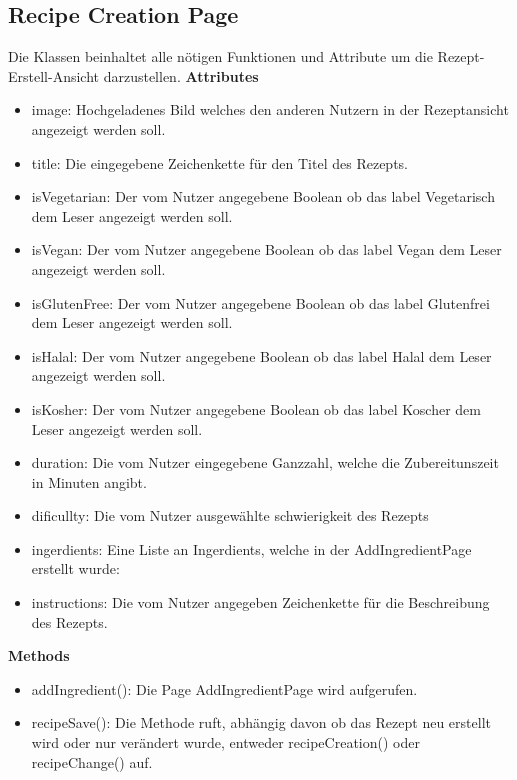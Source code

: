 \documentclass[parskip=full]{scrartcl}
\begin{document}
    \subsection{Recipe Creation Page}
        Die Klassen beinhaltet alle nötigen Funktionen und Attribute um die Rezept-Erstell-Ansicht darzustellen.\newline
        \textbf{Attributes}
        \begin{itemize}
            \item image: Hochgeladenes Bild welches den anderen Nutzern in der Rezeptansicht angezeigt werden soll.
            \item title: Die eingegebene Zeichenkette für den Titel des Rezepts.
            \item isVegetarian: Der vom Nutzer angegebene Boolean ob das \gls{label} Vegetarisch dem Leser angezeigt werden soll.
            \item isVegan: Der vom Nutzer angegebene Boolean ob das \gls{label} Vegan dem Leser angezeigt werden soll.
            \item isGlutenFree: Der vom Nutzer angegebene Boolean ob das \gls{label} Glutenfrei dem Leser angezeigt werden soll.
            \item isHalal: Der vom Nutzer angegebene Boolean ob das \gls{label} Halal dem Leser angezeigt werden soll.
            \item isKosher: Der vom Nutzer angegebene Boolean ob das \gls{label} Koscher dem Leser angezeigt werden soll.
            \item duration: Die vom Nutzer eingegebene Ganzzahl, welche die Zubereitunszeit in Minuten angibt.
            \item dificullty: Die vom Nutzer ausgewählte \gls{schwierigkeit} des Rezepts
            \item ingerdients: Eine Liste an Ingerdients, welche in der AddIngredientPage erstellt wurde:
            \item instructions: Die vom Nutzer angegeben Zeichenkette für die Beschreibung des Rezepts.
        \end{itemize}
        
        \textbf{Methods}
        \begin{itemize}
            \item addIngredient(): Die Page AddIngredientPage wird aufgerufen.
            \item recipeSave(): Die Methode ruft, abhängig davon ob das Rezept neu erstellt wird oder nur verändert wurde, entweder recipeCreation() oder recipeChange() auf.
        \end{itemize}
\end{document}
